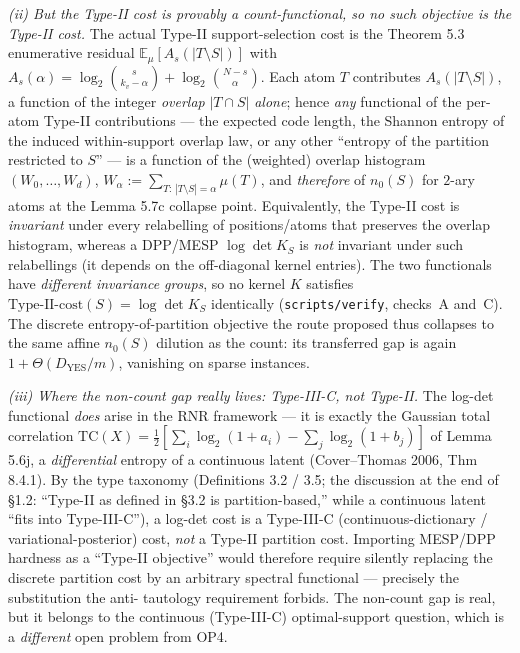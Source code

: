 \documentclass[
]{article}
\begin{document}
\emph{(ii) But the Type-II cost is provably a count-functional, so no such
objective is the Type-II cost.} The actual Type-II support-selection cost
is the Theorem 5.3 enumerative residual
$\mathbb E_\mu[A_s(|T\setminus S|)]$ with
$A_s(\alpha)=\log_2\binom{s}{k_v-\alpha}+\log_2\binom{N-s}{\alpha}$. Each
atom $T$ contributes $A_s(|T\setminus S|)$, a function of the integer
\emph{overlap} $|T\cap S|$ \emph{alone}; hence \emph{any} functional of the
per-atom Type-II contributions --- the expected code length, the Shannon
entropy of the induced within-support overlap law, or any other
``entropy of the partition restricted to $S$'' --- is a function of the
(weighted) overlap histogram $(W_0,\dots,W_d)$, $W_\alpha:=\sum_{T:\,
|T\setminus S|=\alpha}\mu(T)$, and \emph{therefore} of $n_0(S)$ for
$2$-ary atoms at the Lemma 5.7c collapse point. Equivalently, the Type-II
cost is \emph{invariant} under every relabelling of positions/atoms that
preserves the overlap histogram, whereas a DPP/MESP $\log\det K_S$ is
\emph{not} invariant under such relabellings (it depends on the off-diagonal
kernel entries). The two functionals have \emph{different invariance
groups}, so no kernel $K$ satisfies $\text{Type-II-cost}(S)=\log\det K_S$
identically (\texttt{scripts/verify}, checks~A and~C). The discrete
entropy-of-partition objective the route proposed thus collapses to the
same affine $n_0(S)$ dilution as the count: its transferred gap is again
$1+\Theta(D_{\mathrm{YES}}/m)$, vanishing on sparse instances.

\emph{(iii) Where the non-count gap really lives: Type-III-C, not Type-II.}
The log-det functional \emph{does} arise in the RNR framework --- it is
exactly the Gaussian total correlation $\mathrm{TC}(X)=\tfrac12[\sum_i
\log_2(1+a_i)-\sum_j\log_2(1+b_j)]$ of Lemma 5.6j, a \emph{differential}
entropy of a continuous latent (Cover--Thomas 2006, Thm 8.4.1). By the
type taxonomy (Definitions 3.2 / 3.5; the discussion at the end of \S 1.2:
``Type-II as defined in \S 3.2 is partition-based,'' while a continuous
latent ``fits into Type-III-C''), a log-det cost is a Type-III-C
(continuous-dictionary / variational-posterior) cost, \emph{not} a Type-II
partition cost. Importing MESP/DPP hardness as a ``Type-II objective''
would therefore require silently replacing the discrete partition cost by an
arbitrary spectral functional --- precisely the substitution the anti-
tautology requirement forbids. The non-count gap is real, but it belongs to
the continuous (Type-III-C) optimal-support question, which is a
\emph{different} open problem from OP4.
\end{document}
